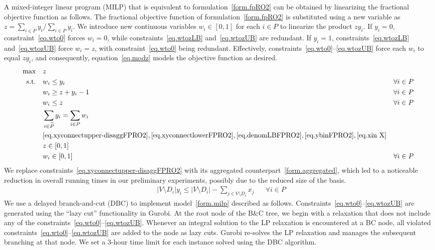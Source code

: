 A mixed-integer linear program (MILP) that is equivalent to formulation~\eqref{form.fpRO2} can be obtained by linearizing the fractional objective function as follows. The fractional objective function of formulation~\eqref{form.fpRO2} is substituted using a new variable as $z = {\sum\limits_{i \in \widetilde{P}} y_i}/{\sum\limits_{i \in P} y_i}$.
 We introduce new continuous variables $w_i \in [0,1]$ for each $i\in P$ to linearize the product $zy_i$. 
 If $y_i = 0$, constraint~\eqref{eq.wto0} forces $w_i = 0$, while constraints~\eqref{eq.wtozLB} and~\eqref{eq.wtozUB} are redundant. If $y_i =1$, constraints~\eqref{eq.wtozLB} and~\eqref{eq.wtozUB} force $w_i=z$, with constraint~\eqref{eq.wto0} being redundant. Effectively, constraints~\eqref{eq.wto0}--\eqref{eq.wtozUB} force each $w_i$ to equal $zy_i$, and consequently, equation~\eqref{eq.modz} models the objective function as desired. 
\begin{subequations}\label{form.milp}
\begin{align}
    \max \quad & z && \\
\text{s.t.} \quad  \label{eq.wto0}     & w_i \le y_i && \forall i\in P\\ 
 \label{eq.wtozLB}   & w_i \ge z + y_i -1 && \forall i\in P\\
  \label{eq.wtozUB}  & w_i \le z && \forall i\in P\\
\label{eq.modz} & \sum_{i \in \widetilde{P}} y_i = \sum_{i \in P} w_i && \\
 & \eqref{eq.xyconnectupper-disaggFPRO2}, \eqref{eq.xyconnectlowerFPRO2}, \eqref{eq.denomLBFPRO2}, \eqref{eq.ybinFPRO2}, \eqref{eq.xin X} && \nonumber\\
 \label{eq.zbound} &z \in [0,1] && \\
       \label{eq.wbound} &w_i \in [0,1] && \forall i\in P
\end{align}
\end{subequations}
We replace constraints~\eqref{eq.xyconnectupper-disaggFPRO2} with its  aggregated counterpart~\eqref{form.aggregated}, which led to a noticeable reduction in overall running times in our preliminary experiments, possibly due to the reduced size of the basis. 
\begin{align}\label{form.aggregated}
   & |V\setminus D_i|y_i \le   |V\setminus D_i|- \sum_{j \in V\setminus D_i}x_j  && \forall i \in P
\end{align}
We use a delayed branch-and-cut (DBC) to implement model~\eqref{form.milp} described as follows. Constraints~\eqref{eq.wto0}--\eqref{eq.wtozUB} are generated using the ``lazy cut'' functionality in Gurobi. At the root node of the B\&C tree, we begin with a relaxation that does not include any of the constraints~\eqref{eq.wto0}--\eqref{eq.wtozUB}. Whenever an integral solution to the LP relaxation is encountered at a BC node, all violated constraints~\eqref{eq.wto0}--\eqref{eq.wtozUB} are added to the node as lazy cuts. Gurobi re-solves the LP relaxation and manages the subsequent branching at that node. We set a 3-hour time limit for each instance solved using the DBC algorithm.

